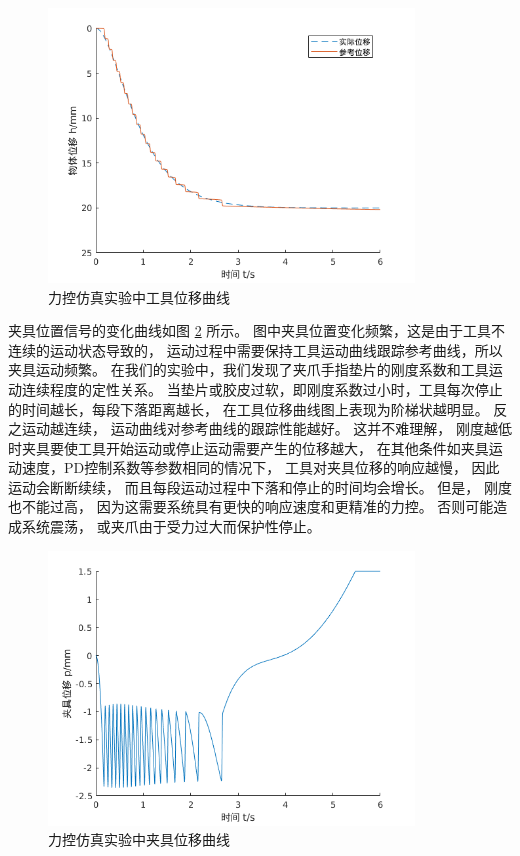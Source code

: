 \begin{figure}[!ht]
  \centering
  \includegraphics[width=9.7cm]{chapter04/pic/h_x}
  \caption{\label{fig:h_x}
    力控仿真实验中工具位移曲线}
  \vspace{-0.3cm}
\end{figure}


夹具位置信号的变化曲线如图 \ref{fig:p_x} 所示。
图中夹具位置变化频繁，这是由于工具不连续的运动状态导致的，
运动过程中需要保持工具运动曲线跟踪参考曲线，所以夹具运动频繁。
在我们的实验中，我们发现了夹爪手指垫片的刚度系数和工具运动连续程度的定性关系。
当垫片或胶皮过软，即刚度系数过小时，工具每次停止的时间越长，每段下落距离越长，
在工具位移曲线图上表现为阶梯状越明显。
反之运动越连续， 运动曲线对参考曲线的跟踪性能越好。
这并不难理解， 刚度越低时夹具要使工具开始运动或停止运动需要产生的位移越大，
在其他条件如夹具运动速度，PD控制系数等参数相同的情况下， 工具对夹具位移的响应越慢，
因此运动会断断续续， 而且每段运动过程中下落和停止的时间均会增长。
但是， 刚度也不能过高， 因为这需要系统具有更快的响应速度和更精准的力控。
否则可能造成系统震荡， 或夹爪由于受力过大而保护性停止。

\begin{figure}[!ht]
  \centering
  \includegraphics[width=9.7cm]{chapter04/pic/p_x}
  \caption{\label{fig:p_x}
    力控仿真实验中夹具位移曲线}
  \vspace{-0.3cm}
\end{figure}

